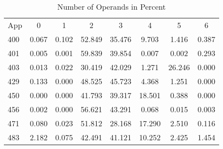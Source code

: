 \begin{Solution}
\begin{table}[H]
    \centering
    \caption{Number of Operands in Percent}
    \label{tab:pD:num_operands}
    \begin{tabular}{| l | c | c | c | c | c | c | c |}
        \hline
        \multirow{2}{*}{App} & \multirow{2}{*}{0} & \multirow{2}{*}{1} & \multirow{2}{*}{2} & \multirow{2}{*}{3} & \multirow{2}{*}{4} & \multirow{2}{*}{5} & \multirow{2}{*}{6} \\
        & & & & & & & \\
        \hline
        400 & 0.067 & 0.102 & 52.849 & 35.476 & 9.703 & 1.416 & 0.387 \\
        \hline
        401 & 0.005 & 0.001 & 59.839 & 39.854 & 0.007 & 0.002 & 0.293 \\
        \hline
        403 & 0.013 & 0.022 & 30.419 & 42.029 & 1.271 & 26.246 & 0.000 \\
        \hline
        429 & 0.133 & 0.000 & 48.525 & 45.723 & 4.368 & 1.251 & 0.000 \\
        \hline
        450 & 0.000 & 0.000 & 41.793 & 39.317 & 18.501 & 0.388 & 0.000 \\
        \hline
        456 & 0.002 & 0.000 & 56.621 & 43.291 & 0.068 & 0.015 & 0.003 \\
        \hline
        471 & 0.080 & 0.023 & 51.812 & 28.168 & 17.290 & 2.510 & 0.116 \\
        \hline
        483 & 2.182 & 0.075 & 42.491 & 41.121 & 10.252 & 2.425 & 1.454 \\
        \hline
    \end{tabular}
\end{table}


\end{Solution}
